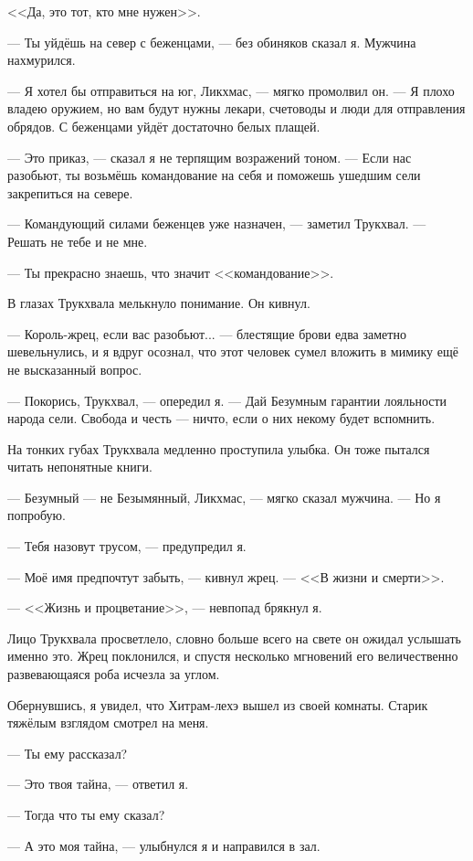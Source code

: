 <<Да, это тот, кто мне нужен>>.

--- Ты уйдёшь на север с беженцами, --- без обиняков сказал я.
Мужчина нахмурился.

--- Я хотел бы отправиться на юг, Ликхмас, --- мягко промолвил он.
--- Я плохо владею оружием, но вам будут нужны лекари, счетоводы и люди для отправления обрядов.
С беженцами уйдёт достаточно белых плащей.

--- Это приказ, --- сказал я не терпящим возражений тоном.
--- Если нас разобьют, ты возьмёшь командование на себя и поможешь ушедшим сели закрепиться на севере.

--- Командующий силами беженцев уже назначен, --- заметил Трукхвал.
--- Решать не тебе и не мне.

--- Ты прекрасно знаешь, что значит <<командование>>.

В глазах Трукхвала мелькнуло понимание.
Он кивнул.

--- Король-жрец, если вас разобьют... --- блестящие брови едва заметно шевельнулись, и я вдруг осознал, что этот человек сумел вложить в мимику ещё не высказанный вопрос.

--- Покорись, Трукхвал, --- опередил я.
--- Дай Безумным гарантии лояльности народа сели.
Свобода и честь --- ничто, если о них некому будет вспомнить.

На тонких губах Трукхвала медленно проступила улыбка.
Он тоже пытался читать непонятные книги.

--- Безумный --- не Безымянный, Ликхмас, --- мягко сказал мужчина.
--- Но я попробую.

--- Тебя назовут трусом, --- предупредил я.

--- Моё имя предпочтут забыть, --- кивнул жрец.
--- <<В жизни и смерти>>.

--- <<Жизнь и процветание>>, --- невпопад брякнул я.

Лицо Трукхвала просветлело, словно больше всего на свете он ожидал услышать именно это.
Жрец поклонился, и спустя несколько мгновений его величественно развевающаяся роба исчезла за углом.

Обернувшись, я увидел, что Хитрам-лехэ вышел из своей комнаты.
Старик тяжёлым взглядом смотрел на меня.

--- Ты ему рассказал?

--- Это твоя тайна, --- ответил я.

--- Тогда что ты ему сказал?

--- А это моя тайна, --- улыбнулся я и направился в зал.

